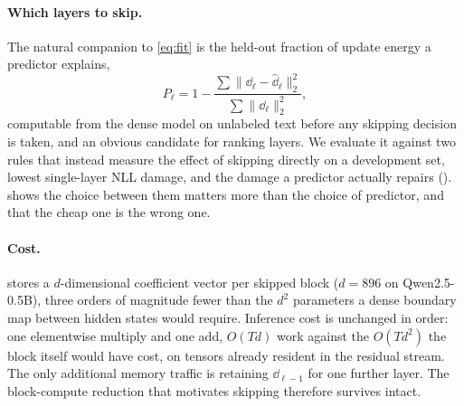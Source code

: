 \paragraph{Which layers to skip.} The natural companion to \cref{eq:fit} is the
held-out fraction of update energy a predictor explains,
\begin{equation}
P_\ell = 1 -
\frac{\sum \|\dd_\ell - \widehat{\dd}_\ell\|_2^2}
     {\sum \|\dd_\ell\|_2^2},
\label{eq:pscore}
\end{equation}
computable from the dense model on unlabeled text before any skipping decision is taken,
and an obvious candidate for ranking layers. We evaluate it against two rules that instead
measure the effect of skipping directly on a development set, lowest single-layer NLL
damage, and the damage a predictor actually repairs ().
 shows the choice between them matters more than the choice of
predictor, and that the cheap one is the wrong one.

\paragraph{Cost.} \mname stores a $d$-dimensional coefficient vector per skipped
block ($d = 896$ on Qwen2.5-0.5B), three orders of magnitude fewer than the $d^2$
parameters a dense boundary map between hidden states would require. Inference cost is unchanged in order: one elementwise multiply and one add,
$O(Td)$ work against the $O(Td^2)$ the block itself would have cost, on tensors
already resident in the residual stream. The only additional memory traffic is
retaining $\dd_{\ell-1}$ for one further layer. The block-compute reduction that
motivates skipping therefore survives intact.
